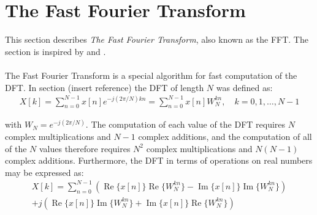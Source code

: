 \section{The Fast Fourier Transform} \label{sec:FFT}
This section describes \textit{The Fast Fourier Transform}, also known as the FFT. The section is inspired by \cite{pages 750, 755-763, DTSP} and \cite{page 303, FSP}.
\\ \\
The Fast Fourier Transform is a special algorithm for fast computation of the DFT. In section (insert reference) the DFT of length $N$ was defined as:
\begin{align*}
X[k] = \sum_{n=0}^{N-1} x[n] e^{-j(2\pi/N)kn} = \sum_{n=0}^{N-1} x[n] W_N^{kn}, \quad k = 0, 1, \dots, N-1
\end{align*}

with $W_N = e^{-j(2\pi/N)}$. The computation of each value of the DFT requires $N$ complex multiplications and $N-1$ complex additions, and the computation of all of the $N$ values therefore requires $N^2$ complex multiplications and $N(N-1)$ complex additions. Furthermore, the DFT in terms of operations on real numbers may be expressed as:
\begin{align*}
X[k] = \sum_{n=0}^{N-1} \left( \operatorname{Re}\{x[n]\} \operatorname{Re} \{W_N^{kn}\} - \operatorname{Im}\{x[n]\}\operatorname{Im} \{W_N^{kn}\} \right) \\ + j \left( \operatorname{Re} \{x[n]\}\operatorname{Im} \{W_N^{kn}\} + \operatorname{Im} \{x[n]\} \operatorname{Re}\{W_N^{kn}\}\right)
\end{align*}

